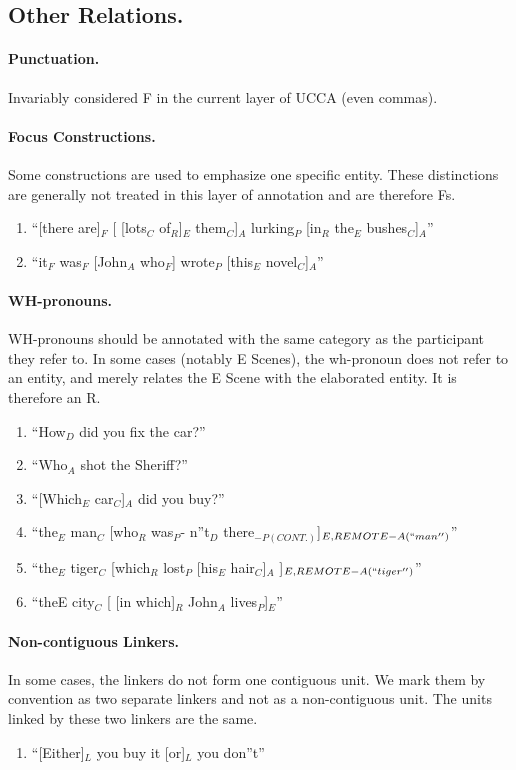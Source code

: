 \documentclass[11pt]{article}
\newcommand{\be}{\begin{enumerate}}
\newcommand{\ee}{\end{enumerate}}
\begin{document}
\subsection{Other Relations.}

\paragraph{Punctuation.} Invariably considered F in the current layer of UCCA (even commas).

\paragraph{Focus Constructions.} Some constructions are used to emphasize one specific entity. These distinctions are generally not treated in this layer of annotation and are therefore Fs.
\be
\item
``[there are]$_F$ [ [lots$_C$ of$_R$]$_E$ them$_C$]$_A$ lurking$_P$ [in$_R$ the$_E$ bushes$_C$]$_A$''
\item
``it$_F$ was$_F$  [John$_A$ who$_F$] wrote$_P$ [this$_E$ novel$_C$]$_A$''
\ee

\paragraph{WH-pronouns.} WH-pronouns should be annotated with the same category as the participant they refer to. In some cases (notably E Scenes), the wh-pronoun does not refer to an entity, and merely relates the E Scene with the elaborated entity. It is therefore an R.
\be \item
``How$_D$ did you fix the car?''
\item
``Who$_A$ shot the Sheriff?''
\item
``[Which$_E$ car$_C$]$_A$ did you buy?''
\item
``the$_E$ man$_C$ [who$_R$ was$_P$- n''t$_D$ there$_{-P(CONT.)}$]$_{E,REMOTE-A(``man'')}$''
\item
``the$_E$ tiger$_C$ [which$_R$ lost$_P$ [his$_E$ hair$_C$]$_A$ ]$_{E,REMOTE-A(``tiger'')}$''
\item
``the­E city$_C$ [ [in which]$_R$ John$_A$ lives$_P$]$_E$''
\ee

\paragraph{Non-contiguous Linkers.} In some cases, the linkers do not form one contiguous unit. We mark them by convention as two separate linkers and not as a non-contiguous unit. The units linked by these two linkers are the same.
\be \item
``[Either]$_L$ you buy it [or]$_L$ you don''t''
\ee
\end{document}
